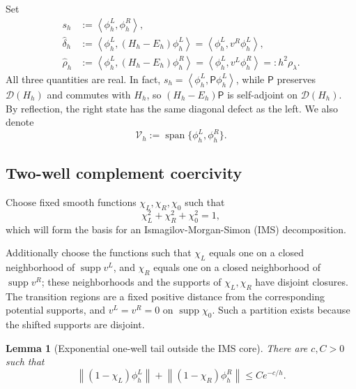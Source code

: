 \documentclass[11pt]{article}
\newtheorem{lemma}[theorem]{Lemma}
\newcommand{\norm}[1]{\left\|#1\right\|}
\newcommand{\ip}[2]{\left\langle #1,#2\right\rangle}
\newcommand{\supp}{\operatorname{supp}}
\begin{document}
Set
\begin{align}
 s_h&:=\ip{\phi_h^L}{\phi_h^R},\label{eq:overlap-def}\\
 \widehat\delta_h
 &:=\ip{\phi_h^L}{(H_h-E_h)\phi_h^L}
 =\ip{\phi_h^L}{v^R\phi_h^L},\label{eq:delta-scaled}\\
 \widehat\rho_h
 &:=\ip{\phi_h^L}{(H_h-E_h)\phi_h^R}
 =\ip{\phi_h^L}{v^L\phi_h^R}
 =:h^2\rho_\lambda.\label{eq:rho-scaled}
\end{align}
All three quantities are real. In fact, $s_h=\ip{\phi_h^L}{\mathsf P\phi_h^L}$,
while $\mathsf P$ preserves $\mathcal D(H_h)$ and commutes with $H_h$, so
$(H_h-E_h)\mathsf P$ is self-adjoint on $\mathcal D(H_h)$. By reflection,
the right state has the same diagonal defect as the left. We also denote
\begin{equation}\label{eq:Vspan}
 \mathcal V_h:=\operatorname{span}\{\phi_h^L,\phi_h^R\}.
\end{equation}

\subsection{Two-well complement coercivity}
\label{sec:complement-coercivity}

Choose fixed smooth functions $\chi_L,\chi_R,\chi_0$ such that
\begin{equation}\label{eq:IMS-partition}
 \chi_L^2+\chi_R^2+\chi_0^2=1,
\end{equation}
which will form the basis for an  Ismagilov-Morgan-Simon (IMS) decomposition. 

Additionally choose the functions such that $\chi_L$ equals one on a closed neighborhood of $\supp v^L$,
and $\chi_R$ equals one on a closed neighborhood of $\supp v^R$; these
neighborhoods and the supports of $\chi_L,\chi_R$ have disjoint closures.
The transition regions are a fixed positive distance from the corresponding
potential supports, and $v^L=v^R=0$ on $\supp\chi_0$.  Such a partition exists because the shifted supports are disjoint.

\begin{lemma}[Exponential one-well tail outside the IMS core]
\label{lem:IMS-tail}
There are $c,C>0$ such that
\begin{equation}\label{eq:IMS-tail-bound}
 \norm{(1-\chi_L)\phi_h^L}
 +\norm{(1-\chi_R)\phi_h^R}
 \le Ce^{-c/h}.
\end{equation}
\end{lemma}
\end{document}
